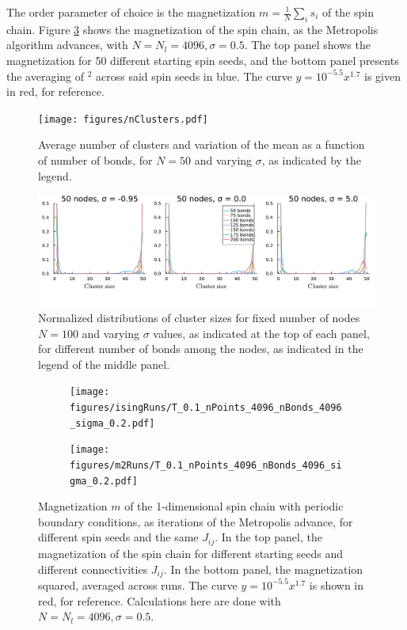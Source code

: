 The order parameter of choice is the magnetization $m = \frac{1}{N}\sum_i s_i $ of the spin chain. Figure \ref{fig:magnetization} shows the magnetization of the spin chain, as the Metropolis algorithm advances, with $N = N_l = 4096, \sigma = 0.5$. The top panel shows the magnetization for 50 different starting spin seeds, and the bottom panel presents the averaging of $^2$ across said spin seeds in blue. The curve  $y = 10^{-5.5} x^{1.7} $ is given in red, for reference.

\begin{figure}
	\centering
	\texttt{[image: figures/nClusters.pdf]}
	\caption{Average number of clusters and variation of the mean as a function of number of bonds, for $N=50$ and varying $\sigma$, as indicated by the legend.}
	\label{fig:nClusters}
\end{figure}

\begin{figure}
		\centering
		\includegraphics[width=\textwidth]{figures/clusterSizeDistribution.pdf}
	\caption{Normalized distributions of cluster sizes for fixed number of nodes $N=100$ and  varying $\sigma$ values, as indicated at the top of each panel, for different number of bonds among the nodes, as indicated in the legend of the middle panel.}
	\label{fig:clusterLengthDistribution}
\end{figure}
\begin{figure}[p]
	\centering
	\begin{subfigure}{0.8\textwidth}
	\texttt{[image: figures/isingRuns/T\_0.1\_nPoints\_4096\_nBonds\_4096\_sigma\_0.2.pdf]}
	\end{subfigure}
	\begin{subfigure}{0.8\textwidth}
	\texttt{[image: figures/m2Runs/T\_0.1\_nPoints\_4096\_nBonds\_4096\_sigma\_0.2.pdf]}
	\end{subfigure}
	\caption{ Magnetization $m$ of the 1-dimensional spin chain with periodic boundary conditions, as iterations of the Metropolis advance, for different spin seeds and the same $J_{ij}$. In the top panel, the magnetization of the spin chain for different starting seeds and different connectivities $J_{ij}$. In the bottom panel, the magnetization squared, averaged across runs. The curve $y=10^{-5.5} x^{1.7}$ is shown in red, for reference. Calculations here are done with $N = N_l = 4096, \sigma = 0.5.$}
	\label{fig:magnetization}
\end{figure}
